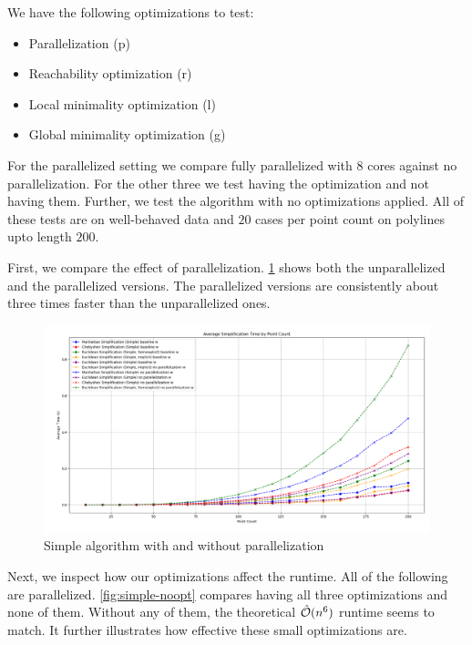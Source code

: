 We have the following optimizations to test:
\begin{itemize}
	\item Parallelization (p)
	\item Reachability optimization (r)
	\item Local minimality optimization (l)
	\item Global minimality optimization (g)
\end{itemize}

For the parallelized setting we compare fully parallelized with \(8\) cores against no parallelization. For the other three we test having the optimization and not having them. Further, we test the algorithm with no optimizations applied. All of these tests are on well-behaved data and \(20\) cases per point count on polylines upto length \(200\).

First, we compare the effect of parallelization. \cref{fig:simple-seq} shows both the unparallelized and the parallelized versions. The parallelized versions are consistently about three times faster than the unparallelized ones.

\begin{figure}[b]
  \centering
	\includegraphics[scale=0.4]{./figures/simple-seq.png}
  \caption{Simple algorithm with and without parallelization}
  \label{fig:simple-seq}
\end{figure}

Next, we inspect how our optimizations affect the runtime. All of the following are parallelized. \cref{fig:simple-noopt} compares having all three optimizations and none of them. Without any of them, the theoretical \(\hat{\mathcal{O}}(n^6)\) runtime seems to match. It further illustrates how effective these small optimizations are.

